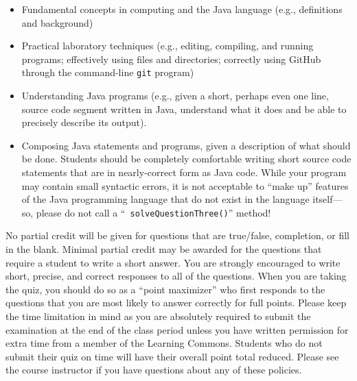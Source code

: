 \documentclass[11pt]{article}
\begin{document}
\vspace*{-.05in}
\begin{itemize}

  \itemsep 0in

  \item Fundamental concepts in computing and the Java language (e.g.,
    definitions and background)

  \item Practical laboratory techniques (e.g., editing, compiling, and running
    programs; effectively using files and directories; correctly using GitHub
    through the command-line {\tt git} program)

  \item Understanding Java programs (e.g., given a short, perhaps even one line,
    source code segment written in Java, understand what it does and be able to
    precisely describe its output).

  \item Composing Java statements and programs, given a description of what
    should be done. Students should be completely comfortable writing short
    source code statements that are in nearly-correct form as Java code. While
    your program may contain small syntactic errors, it is not acceptable to
    ``make up'' features of the Java programming language that do not exist in
    the language itself---so, please do not call a ``{\tt
    solveQuestionThree()}'' method!

\end{itemize}

\noindent No partial credit will be given for questions that are true/false,
completion, or fill in the blank. Minimal partial credit may be awarded for the
questions that require a student to write a short answer. You are strongly
encouraged to write short, precise, and correct responses to all of the
questions. When you are taking the quiz, you should do so as a ``point
maximizer'' who first responds to the questions that you are most likely to
answer correctly for full points. Please keep the time limitation in mind as you
are absolutely required to submit the examination at the end of the class period
unless you have written permission for extra time from a member of the Learning
Commons. Students who do not submit their quiz on time will have their overall
point total reduced. Please see the course instructor if you have questions
about any of these policies.

\end{document}
